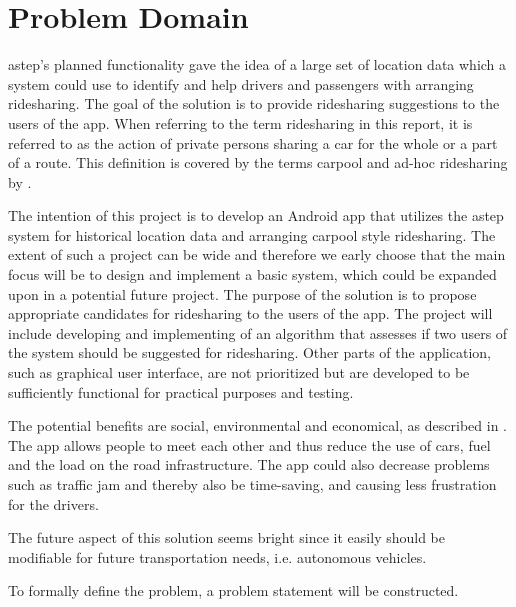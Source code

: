 \section{Problem Domain}
\gls{astep}'s planned functionality gave the idea of a large set of location data which a system could use to identify and help drivers and passengers with arranging ridesharing.
The goal of the solution is to provide ridesharing suggestions to the users of the app.
When referring to the term ridesharing in this report, it is referred to as the action of private persons sharing a car for the whole or a part of a route. 
This definition is covered by the terms carpool and ad-hoc ridesharing by \citet{doi:10.1080/01441647.2011.621557}.  

The intention of this project is to develop an Android app that utilizes the \gls{astep} system for historical location data and arranging carpool style ridesharing.
The extent of such a project can be wide and therefore we early choose that the main focus will be to design and implement a basic system, which could be expanded upon in a potential future project.
The purpose of the solution is to propose appropriate candidates for ridesharing to the users of the app.
The project will include developing and implementing of an algorithm that assesses if two users of the system should be suggested for ridesharing.
Other parts of the application, such as graphical user interface, are not prioritized but are developed to be sufficiently functional for practical purposes and testing.

The potential benefits are social, environmental and economical, as described in \cite{doi:10.1080/01441647.2011.621557}.
The app allows people to meet each other and thus reduce the use of cars, fuel and the load on the road infrastructure.
The app could also decrease problems such as traffic jam and thereby also be time-saving, and causing less frustration for the drivers.

The future aspect of this solution seems bright since it easily should be modifiable for future transportation needs, i.e. autonomous vehicles.

To formally define the problem, a problem statement will be constructed.